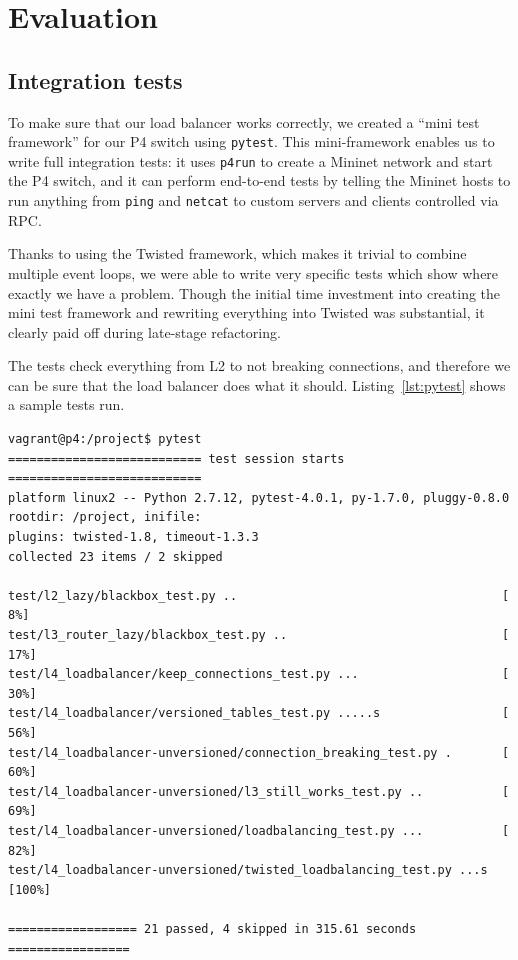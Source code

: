 \documentclass[11pt,oneside,a4paper]{article}
\begin{document}
\section{Evaluation}
\subsection{Integration tests}

To make sure that our load balancer works correctly, we created a ``mini test
framework'' for our P4 switch using \texttt{pytest}\cite{pytest}.
This mini-framework enables us to write full integration tests: it uses
\texttt{p4run} to create a Mininet network and start the P4 switch, and it
can perform end-to-end tests by telling the Mininet hosts to run anything
from \texttt{ping} and \texttt{netcat} to custom servers and clients controlled
via RPC.

Thanks to using the Twisted framework, which makes it trivial to combine
multiple event loops, we were able to write very specific
tests which show where exactly we have a problem.
Though the initial time investment into creating the mini test framework and
rewriting everything into Twisted was substantial, it clearly paid off during
late-stage refactoring.

The tests check everything from L2 to not breaking connections, and therefore we
can be sure that the load balancer does what it should.
Listing~\ref{lst:pytest} shows a sample tests run.

\begin{lstlisting}[basicstyle=\ttfamily\small,breaklines=false,
                   xleftmargin=-.3cm,linewidth=\paperwidth,
                   caption=A sample test session,captionpos=b,
                   label=lst:pytest]
vagrant@p4:/project$ pytest                                          
=========================== test session starts ===========================
platform linux2 -- Python 2.7.12, pytest-4.0.1, py-1.7.0, pluggy-0.8.0
rootdir: /project, inifile:
plugins: twisted-1.8, timeout-1.3.3
collected 23 items / 2 skipped

test/l2_lazy/blackbox_test.py ..                                     [  8%]
test/l3_router_lazy/blackbox_test.py ..                              [ 17%]
test/l4_loadbalancer/keep_connections_test.py ...                    [ 30%]
test/l4_loadbalancer/versioned_tables_test.py .....s                 [ 56%]
test/l4_loadbalancer-unversioned/connection_breaking_test.py .       [ 60%]
test/l4_loadbalancer-unversioned/l3_still_works_test.py ..           [ 69%]
test/l4_loadbalancer-unversioned/loadbalancing_test.py ...           [ 82%]
test/l4_loadbalancer-unversioned/twisted_loadbalancing_test.py ...s  [100%]

================== 21 passed, 4 skipped in 315.61 seconds =================
\end{lstlisting}
\end{document}
